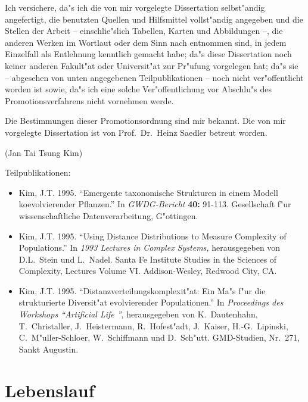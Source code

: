 \begin{appendix}
Ich versichere, da"s ich die von mir vorgelegte Dissertation selbst"andig angefertigt, die benutzten Quellen
und Hilfsmittel vollst"andig angegeben und die Stellen der Arbeit -- einschlie"slich Tabellen, Karten und
Abbildungen --, die anderen Werken im Wortlaut oder dem Sinn nach entnommen sind, in jedem Einzelfall
als Entlehnung kenntlich gemacht habe; da"s diese Dissertation noch keiner anderen Fakult"at oder Universit"at
zur Pr"ufung vorgelegen hat; da"s sie -- abgesehen von unten angegebenen Teilpublikationen --
noch nicht ver"offentlicht worden ist sowie, da"s ich eine solche Ver"offentlichung vor Abschlu"s des
Promotionsverfahrens nicht vornehmen werde.

Die Bestimmungen dieser Promotionsordnung sind mir bekannt. Die von mir vorgelegte Dissertation ist von
Prof.\ Dr.\ Heinz Saedler betreut worden.

\vspace*{3cm}
\noindent (Jan Tai Tsung Kim)

\vspace*{1cm}

\noindent Teilpublikationen:

\begin{itemize}

\item Kim, J.T. 1995. "`Emergente taxonomische Strukturen in einem Modell koevolvierender Pflanzen."'
    In \textsl{GWDG-Bericht} \textbf{40:} 91-113. Gesellschaft f"ur wissenschaftliche Datenverarbeitung, G"ottingen.

\item Kim, J.T. 1995. "`Using Distance Distributions to Measure Complexity of Populations."'
    In \textsl{1993 Lectures in Complex Systems,} herausgegeben von D.L.\ Stein und L.\ Nadel.
    Santa Fe Institute Studies in the Sciences of Complexity, Lectures Volume VI.
    Addison-Wesley, Redwood City, CA.

\item Kim, J.T. 1995. "`Distanzverteilungskomplexit"at: Ein Ma"s f"ur die strukturierte Diversit"at
    evolvierender Populationen."' In \textsl{Proceedings des Workshops "`Artificial Life "'},
    herausgegeben von K.\ Dautenhahn, T.\ Christaller, J.\ Heistermann, R.\ Hofest"adt, J.\ Kaiser,
    H.-G.\ Lipinski, C.\ M"uller-Schloer, W.\ Schiffmann und D.\ Sch"utt. GMD-Studien, Nr.\ 271, Sankt Augustin.

\end{itemize}


\chapter{Lebenslauf}


\end{appendix}
